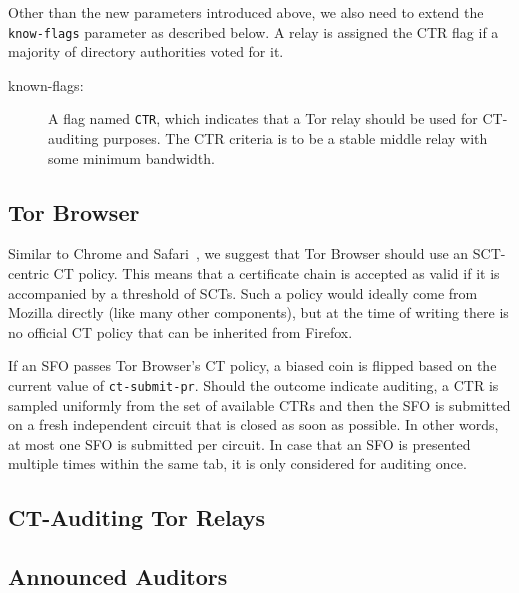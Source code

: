 Other than the new parameters introduced above, we also need to extend the
\texttt{know-flags} parameter as described below.  A relay is assigned the CTR
flag if a majority of directory authorities voted for it.
\begin{description}
	\item[known-flags:] A flag named \texttt{CTR}, which indicates
		that a Tor relay should be used for CT-auditing purposes.  The CTR
		criteria is to be a stable middle relay with some minimum bandwidth.
\end{description}

\subsection{Tor Browser}
Similar to Chrome and Safari~\cite{chrome-policy,safari-policy}, we suggest that
Tor Browser should use an SCT-centric CT policy.  This means that a certificate
chain is accepted as valid if it is accompanied by a threshold of SCTs.  Such a
policy would ideally come from Mozilla directly (like many other components),
but at the time of writing there is no official CT policy that can be inherited
from Firefox.

If an SFO passes Tor Browser's CT policy, a biased coin is flipped based on the
current value of \texttt{ct-submit-pr}.  Should the outcome indicate auditing,
a CTR is sampled uniformly from the set of available CTRs and then the SFO is
submitted on a fresh independent circuit that is closed as soon as possible.  In
other words, at most one SFO is submitted per circuit.  In case that an SFO is
presented multiple times within the same tab, it is only considered for auditing
once.

%
%

\subsection{CT-Auditing Tor Relays}
\subsection{Announced Auditors}
